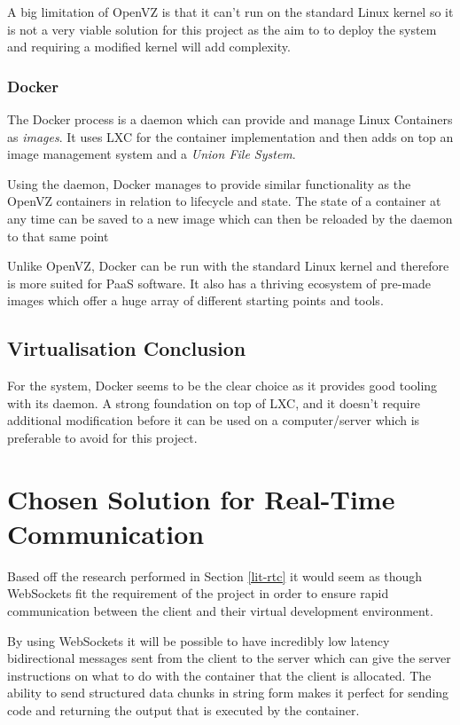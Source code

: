 A big limitation of OpenVZ is that it can't run on the standard Linux kernel so it is not a very viable solution for this project as the aim to to deploy the system and requiring a modified kernel will add complexity.

\subsubsection{Docker}

The Docker process is a daemon which can provide and manage Linux Containers as \textit{images}. It uses LXC for the container implementation and then adds on top an image management system and a \textit{Union File System}.

Using the daemon, Docker manages to provide similar functionality as the OpenVZ containers in relation to lifecycle and state. The state of a container at any time can be saved to a new image which can then be reloaded by the daemon to that same point

Unlike OpenVZ, Docker can be run with the standard Linux kernel and therefore is more suited for PaaS software. It also has a thriving ecosystem of pre-made images which offer a huge array of different starting points and tools.

\subsection{Virtualisation Conclusion}

For the system, Docker seems to be the clear choice as it provides good tooling with its daemon. A strong foundation on top of LXC, and it doesn't require additional modification before it can be used on a computer/server which is preferable to avoid for this project.

\section{Chosen Solution for Real-Time Communication}

Based off the research performed in Section \ref{lit-rtc} it would seem as though WebSockets fit the requirement of the project in order to ensure rapid communication between the client and their virtual development environment.

By using WebSockets it will be possible to have incredibly low latency bidirectional messages sent from the client to the server which can give the server instructions on what to do with the container that the client is allocated. The ability to send structured data chunks in string form makes it perfect for sending code and returning the output that is executed by the container.

